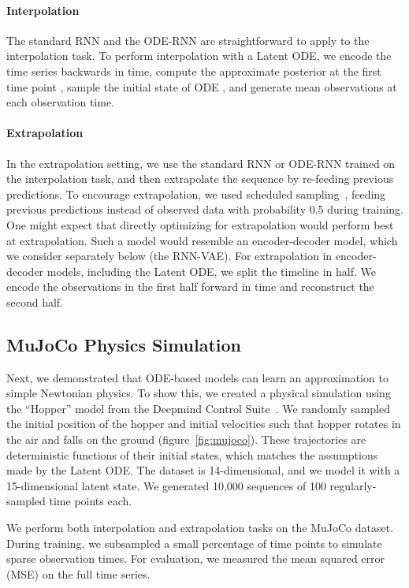 \documentclass{article}
\begin{document}
\paragraph{Interpolation}
The standard RNN and the ODE-RNN are straightforward to apply to the interpolation task.
To perform interpolation with a Latent ODE, we encode the time series backwards in time, compute the approximate posterior  at the first time point , sample the initial state of ODE , and generate mean observations at each observation time.

\paragraph{Extrapolation}
In the extrapolation setting, we use the standard RNN or ODE-RNN trained on the interpolation task, and then extrapolate the sequence by re-feeding previous predictions.
To encourage extrapolation, we used scheduled sampling~\citep{scheduled_sampling}, feeding previous predictions instead of observed data with probability 0.5 during training.
One might expect that directly optimizing for extrapolation would perform best at extrapolation.
Such a model would resemble an encoder-decoder model, which we consider separately below (the RNN-VAE).
For extrapolation in encoder-decoder models, including the Latent ODE, we split the timeline in half.
We encode the observations in the first half forward in time and reconstruct the second half.


\subsection{MuJoCo Physics Simulation}
\label{sec:mujoco}

Next, we demonstrated that ODE-based models can learn an approximation to simple Newtonian physics.
To show this, we created a physical simulation using the ``Hopper'' model from the Deepmind Control Suite~\citep{DeepMindControlSuite}.
We randomly sampled the initial position of the hopper and initial velocities such that hopper rotates in the air and falls on the ground (figure~\ref{fig:mujoco}).
These trajectories are deterministic functions of their initial states, which matches the assumptions made by the Latent ODE.
The dataset is 14-dimensional, and we model it with a 15-dimensional latent state.
We generated 10,000 sequences of 100 regularly-sampled time points each.



We perform both interpolation and extrapolation tasks on the MuJoCo dataset.
During training, we subsampled a small percentage of time points to simulate sparse observation times.
For evaluation, we measured the mean squared error (MSE) on the full time series.
\end{document}
